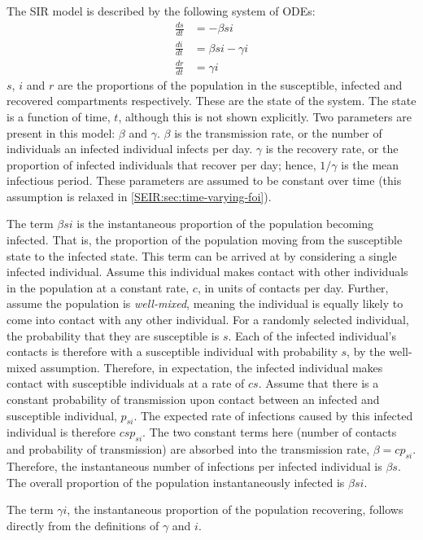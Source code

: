 \documentclass[thesis.tex]{subfiles}
\begin{document}
The SIR model is described by the following system of ODEs:
\begin{align}
\frac{ds}{dt} &= -\beta si \\
\frac{di}{dt} &= \beta si - \gamma i \\
\frac{dr}{dt} &= \gamma i
\end{align}
$s$, $i$ and $r$ are the proportions of the population in the susceptible, infected and recovered compartments respectively.
These are the state of the system.
The state is a function of time, $t$, although this is not shown explicitly.
Two parameters are present in this model: $\beta$ and $\gamma$.
$\beta$ is the transmission rate, or the number of individuals an infected individual infects per day.
$\gamma$ is the recovery rate, or the proportion of infected individuals that recover per day; hence, $1/\gamma$ is the mean infectious period.
These parameters are assumed to be constant over time (this assumption is relaxed in \cref{SEIR:sec:time-varying-foi}).

The term $\beta si$ is the instantaneous proportion of the population becoming infected.
That is, the proportion of the population moving from the susceptible state to the infected state.
This term can be arrived at by considering a single infected individual.
Assume this individual makes contact with other individuals in the population at a constant rate, $c$, in units of contacts per day.
Further, assume the population is \emph{well-mixed}, meaning the individual is equally likely to come into contact with any other individual.
For a randomly selected individual, the probability that they are susceptible is $s$.
Each of the infected individual's contacts is therefore with a susceptible individual with probability $s$, by the well-mixed assumption.
Therefore, in expectation, the infected individual makes contact with susceptible individuals at a rate of $cs$.
Assume that there is a constant probability of transmission upon contact between an infected and susceptible individual, $p_{si}$.
The expected rate of infections caused by this infected individual is therefore $cs p_{si}$.
The two constant terms here (number of contacts and probability of transmission) are absorbed into the transmission rate, $\beta = c p_{si}$.
Therefore, the instantaneous number of infections per infected individual is $\beta s$.
The overall proportion of the population instantaneously infected is $\beta si$.

The term $\gamma i$, the instantaneous proportion of the population recovering, follows directly from the definitions of $\gamma$ and $i$.
\end{document}
